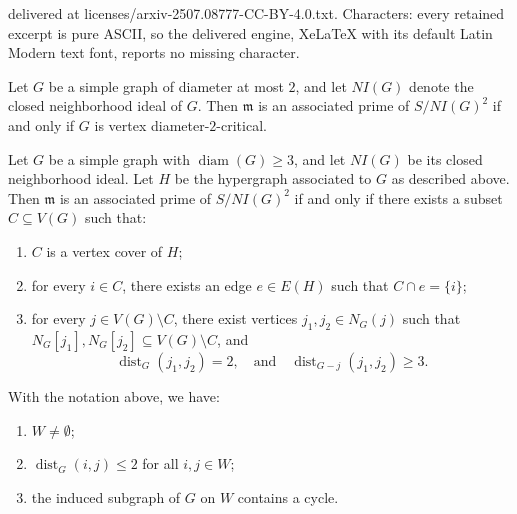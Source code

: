 \documentclass[10pt,a4paper]{amsart}
\DeclareMathOperator{\diam}{diam}
\DeclareMathOperator{\dist}{dist}
\newcommand{\mm}{\mathfrak m}
\begin{document}
delivered at licenses/arxiv-2507.08777-CC-BY-4.0.txt. Characters: every retained excerpt is pure ASCII, so the delivered engine, XeLaTeX with its default Latin Modern text font, reports no missing character.
\begin{thm}\label{thm_diam_2}
Let $G$ be a simple graph of diameter at most $2$, and let $NI(G)$ denote the closed neighborhood ideal of $G$. Then $\mm$ is an associated prime of $S/NI(G)^2$ if and only if $G$ is vertex diameter-$2$-critical.
\end{thm}

\begin{thm}\label{thm_diam_3}
Let $G$ be a simple graph with $\diam(G) \geq 3$, and let $NI(G)$ be its closed neighborhood ideal. Let $H$ be the hypergraph associated to $G$ as described above. Then $\mm$ is an associated prime of $S/NI(G)^2$ if and only if there exists a subset $C \subseteq V(G)$ such that:
\begin{enumerate}
    \item $C$ is a vertex cover of $H$;
    \item for every $i \in C$, there exists an edge $e \in E(H)$ such that $C \cap e = \{i\}$;
    \item for every $j \in V(G) \setminus C$, there exist vertices $j_1, j_2 \in N_G(j)$ such that $N_G[j_1], N_G[j_2] \subseteq V(G) \setminus C$, and 
    \[
    \dist_G(j_1, j_2) = 2, \quad \text{and} \quad \dist_{G - j}(j_1, j_2) \geq 3.
    \]
\end{enumerate}
\end{thm}

\begin{lem}\label{lem_directed_cycle}
With the notation above, we have:
\begin{enumerate}
    \item $W \neq \emptyset$;
    \item $\dist_G(i,j) \le 2$ for all $i,j \in W$;
    \item the induced subgraph of $G$ on $W$ contains a cycle.
\end{enumerate}
\end{lem}
\end{document}
